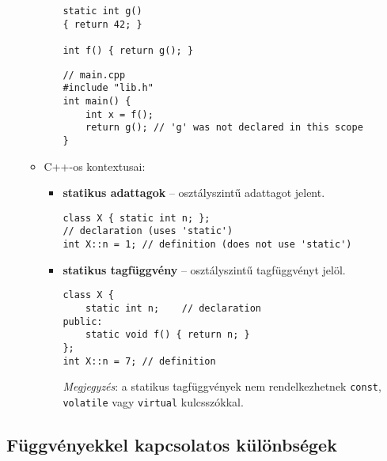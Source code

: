 \documentclass[a4paper, 11pt, oneside]{book}
\begin{document}
\begin{itemize}
\begin{itemize}
\begin{itemize}
\begin{minipage}{0.45\linewidth}
\begin{lstlisting}[style=cppstyle]
static int g() 
{ return 42; }

int f() { return g(); }
\end{lstlisting}
			\end{minipage}
		
\begin{lstlisting}[style=cppstyle]
// main.cpp
#include "lib.h"
int main() { 
	int x = f();
	return g(); // 'g' was not declared in this scope
}
\end{lstlisting}

		\end{itemize}
		
		\item C++-os kontextusai:
		
		\begin{itemize}
			\item \textbf{statikus adattagok} -- osztályszintű adattagot jelent.
			
			\begin{lstlisting}[style=cppstyle]
class X { static int n; }; 
// declaration (uses 'static')
int X::n = 1; // definition (does not use 'static')
			\end{lstlisting}
		
			\item \textbf{statikus tagfüggvény} -- osztályszintű tagfüggvényt jelöl.
			
			\begin{lstlisting}[style=cppstyle]
class X {
	static int n;    // declaration
public:
	static void f() { return n; }
};
int X::n = 7; // definition	
			\end{lstlisting}
			\textit{Megjegyzés}: a statikus tagfüggvények nem rendelkezhetnek \verb*|const|, \verb*|volatile| vagy \verb*|virtual| kulcsszókkal.
		\end{itemize}
	\end{itemize}
\end{itemize}

\subsection{Függvényekkel kapcsolatos különbségek}
\end{document}
